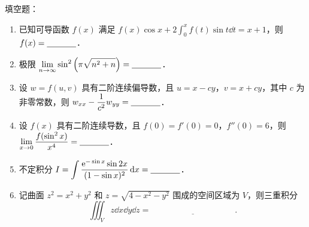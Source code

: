 
填空题：
\begin{enumerate}[label=(\arabic*)]
  \item 已知可导函数 $f(x)$ 满足 $\displaystyle f(x)\cos x+2\int_0^x f(t)\sin t\dd t=x+1$，则 $f(x)=\underline{\hspace{3.5em}}$．
  \item 极限 $\displaystyle \lim_{n\to\infty}\sin^2\left(\pi\sqrt{n^2+n}\right)=\underline{\hspace{3.5em}}$．
  \item 设 $w=f(u,v)$ 具有二阶连续偏导数，且 $u=x-cy$，$v=x+cy$，其中 $c$ 为非零常数，则 $\displaystyle w_{xx}-\frac{1}{c^2}w_{yy}=\underline{\hspace{3.5em}}$．
  \item 设 $f(x)$ 具有二阶连续导数，且 $f(0)=f'(0)=0$，$f''(0)=6$，则 $\displaystyle \lim_{x\to 0}\frac{f(\sin^2 x)}{x^4}=\underline{\hspace{3.5em}}$．
  \item 不定积分 $\displaystyle I=\int\frac{\mathrm{e}^{-\sin x}\sin 2x}{(1-\sin x)^2}\,\mathrm{d} x=\underline{\hspace{3.5em}}$．
  \item 记曲面 $z^2=x^2+y^2$ 和 $z=\sqrt{4-x^2-y^2}$ 围成的空间区域为 $V$，则三重积分
  \[
    \iiint_V z\dd x\dd y\dd z=\underline{\hspace{10em}}.
  \]
\end{enumerate}
